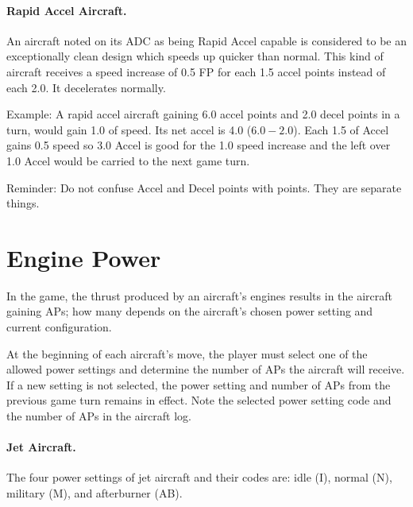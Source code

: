 
\paragraph{Rapid Accel Aircraft.} An aircraft noted on its ADC as being Rapid Accel capable is considered to be an exceptionally clean design which speeds up quicker than normal. This kind of aircraft receives a speed increase of 0.5 FP for each 1.5 accel points instead of each 2.0. It decelerates normally.

Example: A rapid accel aircraft gaining 6.0 accel points and 2.0 decel points in a turn, would gain 1.0 of speed. Its net accel is 4.0 ($6.0 - 2.0$). Each 1.5 of Accel gains 0.5 speed so 3.0 Accel is good for the 1.0 speed increase and the left over 1.0 Accel would be carried to the next game turn.

Reminder:  Do not confuse Accel and Decel points with  points. They are separate things.

\section{Engine Power}
\label{rule:engine-thrust}

In the game, the thrust produced by an aircraft's engines results in the aircraft gaining APs; how many depends on the aircraft's chosen power setting and current configuration. 

At the beginning of each aircraft's move, the player must select one of the allowed power settings and determine the number of APs the aircraft will receive. If a new setting is not selected, the power setting and number of APs from the previous game turn remains in effect. Note the selected power setting code and the number of APs in the aircraft log.

\paragraph{Jet Aircraft.} The four power settings of jet aircraft and their codes are: idle (I), normal (N), military (M), and afterburner (AB).


